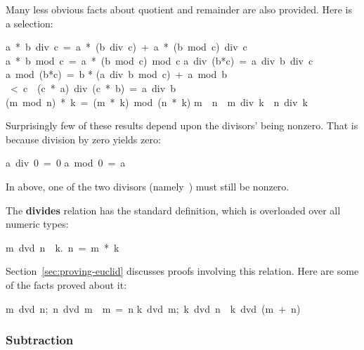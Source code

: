 Many less obvious facts about quotient and remainder are also provided. 
Here is a selection:
\begin{isabelle}
a\ *\ b\ div\ c\ =\ a\ *\ (b\ div\ c)\ +\ a\ *\ (b\ mod\ c)\ div\ c%
\isanewline
a\ *\ b\ mod\ c\ =\ a\ *\ (b\ mod\ c)\ mod\ c%
\isanewline
a\ div\ (b*c)\ =\ a\ div\ b\ div\ c%
\isanewline
a\ mod\ (b*c)\ =\ b * (a\ div\ b\ mod\ c)\ +\ a\ mod\ b%
\ <\ c\ \isasymLongrightarrow \ (c\ *\ a)\ div\ (c\ *\ b)\ =\ a\ div\ b%
\isanewline
(m\ mod\ n)\ *\ k\ =\ (m\ *\ k)\ mod\ (n\ *\ k)
\isanewline
m\ \isasymle \ n\ \isasymLongrightarrow \ m\ div\ k\ \isasymle \ n\ div\ k%
\end{isabelle}

Surprisingly few of these results depend upon the
divisors' being nonzero.
%
That is because division by
zero yields zero:
\begin{isabelle}
a\ div\ 0\ =\ 0
\isanewline
a\ mod\ 0\ =\ a%
\end{isabelle}
In  above, one of
the two divisors (namely~) must still be nonzero.

The \textbf{divides} relation
has the standard definition, which
is overloaded over all numeric types: 
\begin{isabelle}
m\ dvd\ n\ \isasymequiv\ {\isasymexists}k.\ n\ =\ m\ *\ k
\end{isabelle}
%
Section~\ref{sec:proving-euclid} discusses proofs involving this
relation.  Here are some of the facts proved about it:
\begin{isabelle}
\isasymlbrakk m\ dvd\ n;\ n\ dvd\ m\isasymrbrakk \ \isasymLongrightarrow \ m\ =\ n%
\isanewline
\isasymlbrakk k\ dvd\ m;\ k\ dvd\ n\isasymrbrakk \ \isasymLongrightarrow \ k\ dvd\ (m\ +\ n)
\end{isabelle}

\subsubsection{Subtraction}

